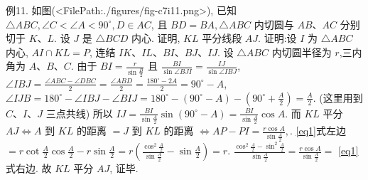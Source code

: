 例11. 如图(<FilePath:./figures/fig-c7i11.png>), 已知 $\triangle A B C, \angle C< \angle A<90^{\circ}, D \in A C$, 且 $B D=B A, \triangle A B C$ 内切圆与 $A B 、 A C$ 分别切于 $K 、 L$. 设 $J$ 是 $\triangle B C D$ 内心.
证明, $K L$ 平分线段 $A J$.
证明:设 $I$ 为 $\triangle A B C$ 内心, $A I \cap K L=P$, 连结 $I K 、 I L 、 B I 、 B J 、 I J$.
设 $\triangle A B C$ 内切圆半径为 $r$,三内角为 $A 、 B 、 C$.
由于 $B I=\frac{r}{\sin \frac{B}{2}}$ 且 $\frac{B I}{\sin \angle B J I}=\frac{I J}{\sin \angle I B J}$,
$\angle I B J=\frac{\angle A B C-\angle D B C}{2}=\frac{\angle A B D}{2}=\frac{180^{\circ}-2 A}{2}=90^{\circ}-A$,
$\angle I J B=180^{\circ}-\angle I B J-\angle B I J=180^{\circ}-\left(90^{\circ}-A\right)-\left(90^{\circ}+\frac{A}{2}\right)=\frac{A}{2}$. (这里用到 $C 、 I 、 J$ 三点共线)
所以 $I J=\frac{B I}{\sin \frac{A}{2}} \sin \left(90^{\circ}-A\right)=\frac{B I}{\sin \frac{A}{2}} \cos A$.
而 $K L$ 平分 $A J \Leftrightarrow A$ 到 $K L$ 的距离 $=J$ 到 $K L$ 的距离
$\Leftrightarrow A P-P I=\frac{r \cos A}{\sin \frac{A}{2}}, \label{eq1}$.
\ref{eq1}式左边 $=r \cot \frac{A}{2} \cos \frac{A}{2}-r \sin \frac{A}{2}=r\left(\frac{\cos ^2 \frac{A}{2}}{\sin \frac{A}{2}}-\sin \frac{A}{2}\right)=r$. $\frac{\cos ^2 \frac{A}{2}-\sin ^2 \frac{A}{2}}{\sin \frac{A}{2}}=\frac{r \cos A}{\sin \frac{A}{2}}=$ \ref{eq1} 式右边.
故 $K L$ 平分 $A J$, 证毕.



